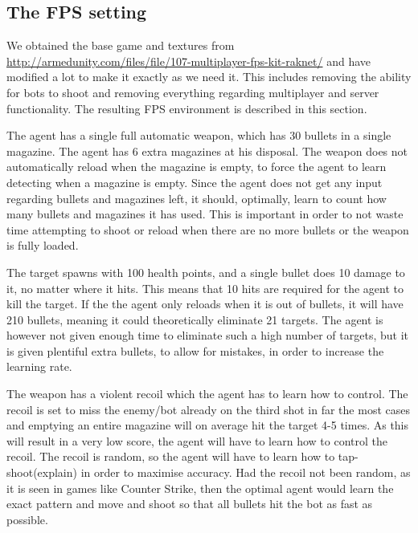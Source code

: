 \subsection{The FPS setting}
\label{sec:fpssetting}
We obtained the base game and textures from \url{http://armedunity.com/files/file/107-multiplayer-fps-kit-raknet/} and have modified a lot to make it exactly as we need it. This includes removing the ability for bots to shoot and removing everything regarding multiplayer and server functionality. The resulting FPS environment is described in this section.

The agent has a single full automatic weapon, which has 30 bullets in a single magazine. The agent has 6 extra magazines at his disposal. The weapon does not automatically reload when the magazine is empty, to force the agent to learn detecting when a magazine is empty. Since the agent does not get any input regarding bullets and magazines left, it should, optimally, learn to count how many bullets and magazines it has used. This is important in order to not waste time attempting to shoot or reload when there are no more bullets or the weapon is fully loaded.

The target spawns with 100 health points, and a single bullet does 10 damage to it, no matter where it hits. This means that 10 hits are required for the agent to kill the target. If the the agent only reloads when it is out of bullets, it will have 210 bullets, meaning it could theoretically eliminate 21 targets. The agent is however not given enough time to eliminate such a high number of targets, but it is given plentiful extra bullets, to allow for mistakes, in order to increase the learning rate.

The weapon has a violent recoil which the agent has to learn how to control. The recoil is set to miss the enemy/bot already on the third shot in far the most cases and emptying an entire magazine will on average hit the target 4-5 times. As this will result in a very low score, the agent will have to learn how to control the recoil. The recoil is random, so the agent will have to learn how to tap-shoot(explain) in order to maximise accuracy. Had the recoil not been random, as it is seen in games like Counter Strike, then the optimal agent would learn the exact pattern and move and shoot so that all bullets hit the bot as fast as possible.

